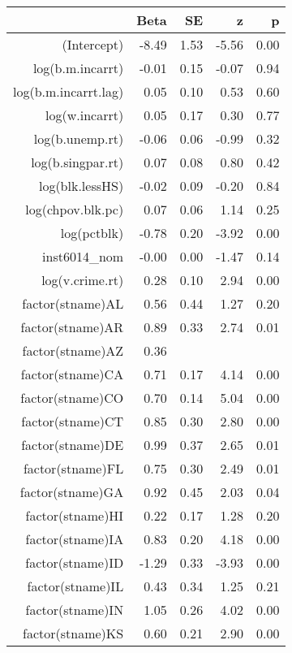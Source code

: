 \begin{table}[ht]
\centering
\begin{tabular}{rrrrr}
  \hline
 & Beta & SE & z & p \\ 
  \hline
(Intercept) & -8.49 & 1.53 & -5.56 & 0.00 \\ 
  log(b.m.incarrt) & -0.01 & 0.15 & -0.07 & 0.94 \\ 
  log(b.m.incarrt.lag) & 0.05 & 0.10 & 0.53 & 0.60 \\ 
  log(w.incarrt) & 0.05 & 0.17 & 0.30 & 0.77 \\ 
  log(b.unemp.rt) & -0.06 & 0.06 & -0.99 & 0.32 \\ 
  log(b.singpar.rt) & 0.07 & 0.08 & 0.80 & 0.42 \\ 
  log(blk.lessHS) & -0.02 & 0.09 & -0.20 & 0.84 \\ 
  log(chpov.blk.pc) & 0.07 & 0.06 & 1.14 & 0.25 \\ 
  log(pctblk) & -0.78 & 0.20 & -3.92 & 0.00 \\ 
  inst6014\_nom & -0.00 & 0.00 & -1.47 & 0.14 \\ 
  log(v.crime.rt) & 0.28 & 0.10 & 2.94 & 0.00 \\ 
  factor(stname)AL & 0.56 & 0.44 & 1.27 & 0.20 \\ 
  factor(stname)AR & 0.89 & 0.33 & 2.74 & 0.01 \\ 
  factor(stname)AZ & 0.36 &  &  &  \\ 
  factor(stname)CA & 0.71 & 0.17 & 4.14 & 0.00 \\ 
  factor(stname)CO & 0.70 & 0.14 & 5.04 & 0.00 \\ 
  factor(stname)CT & 0.85 & 0.30 & 2.80 & 0.00 \\ 
  factor(stname)DE & 0.99 & 0.37 & 2.65 & 0.01 \\ 
  factor(stname)FL & 0.75 & 0.30 & 2.49 & 0.01 \\ 
  factor(stname)GA & 0.92 & 0.45 & 2.03 & 0.04 \\ 
  factor(stname)HI & 0.22 & 0.17 & 1.28 & 0.20 \\ 
  factor(stname)IA & 0.83 & 0.20 & 4.18 & 0.00 \\ 
  factor(stname)ID & -1.29 & 0.33 & -3.93 & 0.00 \\ 
  factor(stname)IL & 0.43 & 0.34 & 1.25 & 0.21 \\ 
  factor(stname)IN & 1.05 & 0.26 & 4.02 & 0.00 \\ 
  factor(stname)KS & 0.60 & 0.21 & 2.90 & 0.00 \\ 

\end{tabular}
\end{table}
